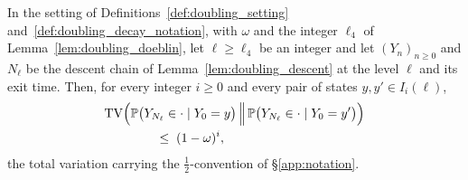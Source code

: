 \begin{lemma}\label{lem:doubling_coupling}
In the setting of Definitions~\ref{def:doubling_setting} and~\ref{def:doubling_decay_notation},
with $\omega$ and the integer $\ell_4$ of Lemma~\ref{lem:doubling_doeblin}, let
$\ell\geq\ell_4$ be an integer and let $(Y_n)_{n\geq0}$ and $N_\ell$ be the descent chain of
Lemma~\ref{lem:doubling_descent} at the level $\ell$ and its exit time. Then, for every integer
$i\geq0$ and every pair of states $y,y'\in I_i(\ell)$,
\begin{equation}\label{eq:doubling_coupling}
\begin{split}
    \mathrm{TV}\Bigl(&\mathbb P\bigl(Y_{N_\ell}\in\cdot\mid Y_0=y\bigr)\,\Big\|\,
    \mathbb P\bigl(Y_{N_\ell}\in\cdot\mid Y_0=y'\bigr)\Bigr)\\
    &\qquad\leq\;(1-\omega)^{i},
\end{split}
\end{equation}
the total variation carrying the $\tfrac12$-convention of \S\ref{app:notation}.
\end{lemma}

